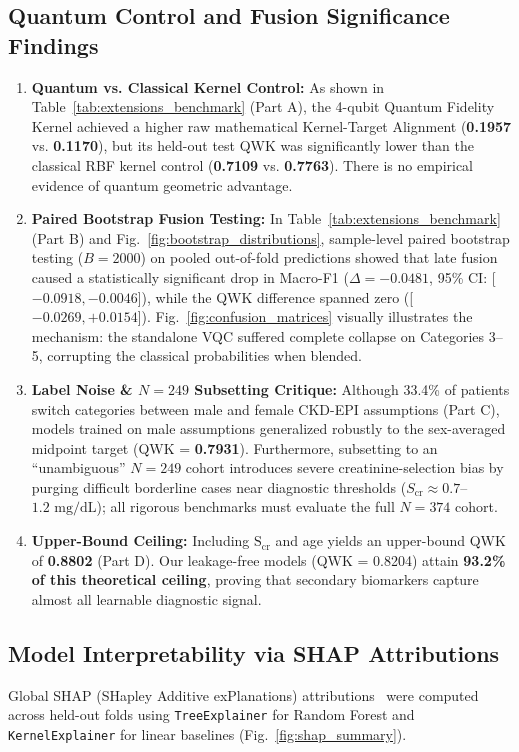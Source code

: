 \documentclass[conference]{IEEEtran}
\begin{document}
\subsection{Quantum Control and Fusion Significance Findings}
\begin{enumerate}
    \item \textbf{Quantum vs. Classical Kernel Control:} As shown in Table~\ref{tab:extensions_benchmark} (Part A), the 4-qubit Quantum Fidelity Kernel achieved a higher raw mathematical Kernel-Target Alignment (\textbf{0.1957} vs. \textbf{0.1170}), but its held-out test QWK was significantly lower than the classical RBF kernel control (\textbf{0.7109} vs. \textbf{0.7763}). There is no empirical evidence of quantum geometric advantage.
    \item \textbf{Paired Bootstrap Fusion Testing:} In Table~\ref{tab:extensions_benchmark} (Part B) and Fig.~\ref{fig:bootstrap_distributions}, sample-level paired bootstrap testing ($B = 2000$) on pooled out-of-fold predictions showed that late fusion caused a statistically significant drop in Macro-F1 ($\Delta = -0.0481$, 95\% CI: [$-0.0918, -0.0046$]), while the QWK difference spanned zero ([$-0.0269, +0.0154$]). Fig.~\ref{fig:confusion_matrices} visually illustrates the mechanism: the standalone VQC suffered complete collapse on Categories 3--5, corrupting the classical probabilities when blended.
    \item \textbf{Label Noise \& $N = 249$ Subsetting Critique:} Although 33.4\% of patients switch categories between male and female CKD-EPI assumptions (Part C), models trained on male assumptions generalized robustly to the sex-averaged midpoint target (QWK = \textbf{0.7931}). Furthermore, subsetting to an ``unambiguous'' $N = 249$ cohort introduces severe creatinine-selection bias by purging difficult borderline cases near diagnostic thresholds ($S_{\text{cr}} \approx 0.7$--$1.2\text{ mg/dL}$); all rigorous benchmarks must evaluate the full $N = 374$ cohort.
    \item \textbf{Upper-Bound Ceiling:} Including $\text{S}_{\text{cr}}$ and age yields an upper-bound QWK of \textbf{0.8802} (Part D). Our leakage-free models (QWK = 0.8204) attain \textbf{93.2\% of this theoretical ceiling}, proving that secondary biomarkers capture almost all learnable diagnostic signal.
\end{enumerate}

\subsection{Model Interpretability via SHAP Attributions}
Global SHAP (SHapley Additive exPlanations) attributions~\cite{lundberg2017unified} were computed across held-out folds using \texttt{TreeExplainer} for Random Forest and \texttt{KernelExplainer} for linear baselines (Fig.~\ref{fig:shap_summary}).
\end{document}
